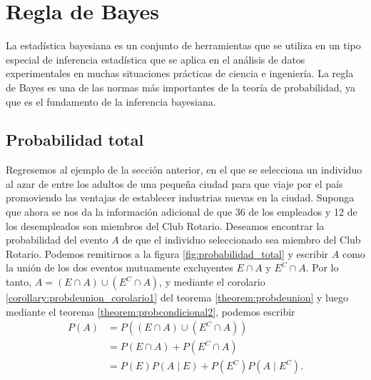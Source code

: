 \section{Regla de Bayes}

La estadística bayesiana es un conjunto de herramientas que se utiliza en un tipo especial de inferencia estadística que se aplica en el análisis de datos experimentales en muchas situaciones prácticas de ciencia e ingeniería. La regla de Bayes es una de las normas más importantes de la teoría de probabilidad, ya que es el fundamento de la inferencia bayesiana.

\subsection*{Probabilidad total}

Regresemos al ejemplo de la sección anterior, en el que se selecciona un individuo al azar de entre los adultos de una pequeña ciudad para que viaje por el país promoviendo las ventajas de establecer industrias nuevas en la ciudad. Suponga que ahora se nos da la información adicional de que 36 de los empleados y 12 de los desempleados son miembros del Club Rotario. Deseamos encontrar la probabilidad del evento $A$ de que el individuo seleccionado sea miembro del Club Rotario. Podemos remitirnos a la figura \ref{fig:probabilidad_total} y escribir $A$ como la unión de los dos eventos mutuamente excluyentes $E \cap A$ y $E^C \cap A$. Por lo tanto, $A = (E \cap A) \cup \left(E^C ∩ A\right)$, y mediante el corolario \ref{corollary:probdeunion_corolario1} del teorema \ref{theorem:probdeunion} y luego mediante el teorema \ref{theorem:probcondicional2}, podemos escribir
\begin{align*}
    P(A) & = P\left( (E \cap A) \cup \left(E^C ∩ A\right) \right) \\
    & = P(E \cap A) + P\left(E^C ∩ A\right) \\
    & = P(E) P(A \mid E) + P\left(E^C\right) P\left(A \mid E^C\right).
\end{align*}
